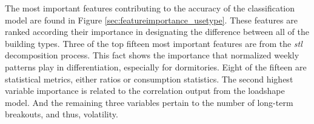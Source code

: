 The most important features contributing to the accuracy of the classification model are found in Figure \ref{sec:featureimportance_usetype}. These features are ranked according their importance in designating the difference between all of the building types. Three of the top fifteen most important features are from the \emph{stl} decomposition process. This fact shows the importance that normalized weekly patterns play in differentiation, especially for dormitories. Eight of the fifteen are statistical metrics, either ratios or consumption statistics. The second highest variable importance is related to the correlation output from the loadshape model. And the remaining three variables pertain to the number of long-term breakouts, and thus, volatility.